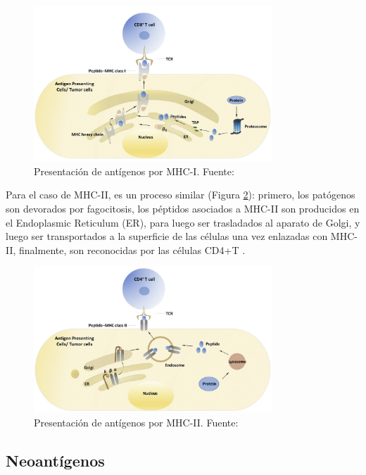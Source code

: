 \begin{figure}[H]
	\centering
	\includegraphics[width=0.8\textwidth]{../img/neoantigen/mhc1.jpg}
	\caption{Presentación de antígenos por MHC-I. Fuente: \cite{zhang2019application}}
	\label{fig:mhc1}
\end{figure}

Para el caso de MHC-II, es un proceso similar (Figura \ref{fig:mhc2}): primero, los patógenos son devorados por fagocitosis, los péptidos asociados a MHC-II son producidos en el Endoplasmic Reticulum (ER), para luego ser trasladados al aparato de Golgi, y luego ser transportados a la superficie de las células una vez enlazadas con MHC-II, finalmente, son reconocidas por las células CD4+T \citep{zhang2019application}.



\begin{figure}[H]
	\centering
	\includegraphics[width=0.8\textwidth]{../img/neoantigen/mhc2.jpg}
	\caption{Presentación de antígenos por MHC-II. Fuente: \cite{zhang2019application}}
	\label{fig:mhc2}
\end{figure}

\subsection{Neoantígenos}

